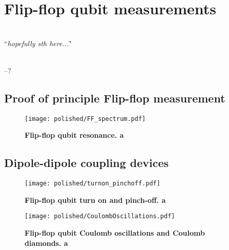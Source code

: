 
\chapter{Flip-flop qubit measurements} %

\label{Chapter7} %

\HRule
\vspace{0.5cm} \hspace{2cm}
\small
\hangindent=4cm
\\
        ``\emph{hopefully sth here...}"
\\ \\
\hangindent=4cm
\begin{flushright}
--? \\
\end{flushright}

\vspace{0.5cm}

\noindent \HRule
\clearpage

\section{Proof of principle Flip-flop measurement} \label{sec:ff_resonance}

\begin{figure}
	\centering
	\texttt{[image: polished/FF\_spectrum.pdf]}
	\caption[Flip-flop qubit resonance]{\textbf{Flip-flop qubit resonance. a}}
	\label{fig:ff_spectrum}
\end{figure}

\section{Dipole-dipole coupling devices} \label{sec:dd_meas}

\begin{figure}
	\centering
	\texttt{[image: polished/turnon\_pinchoff.pdf]}
	\caption[Flip-flop qubit turn on and pinch-off]{\textbf{Flip-flop qubit turn on and pinch-off. a}}
	\label{fig:turnon_pinchoff}
\end{figure}

\begin{figure}
	\centering
	\texttt{[image: polished/CoulombOscillations.pdf]}
	\caption[Flip-flop qubit Coulomb oscillations and diamonds]{\textbf{Flip-flop qubit Coulomb oscillations and Coulomb diamonds. a}}
	\label{fig:coulomb_oscillations}
\end{figure}

